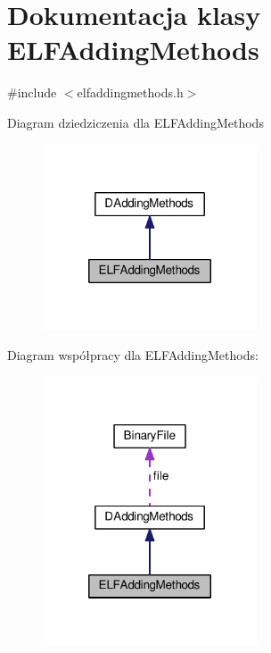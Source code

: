 \hypertarget{class_e_l_f_adding_methods}{\section{Dokumentacja klasy E\-L\-F\-Adding\-Methods}
\label{class_e_l_f_adding_methods}
}


{\ttfamily \#include $<$elfaddingmethods.\-h$>$}



Diagram dziedziczenia dla E\-L\-F\-Adding\-Methods
\nopagebreak
\begin{figure}[H]
\begin{center}
\leavevmode
\includegraphics[width=180pt]{class_e_l_f_adding_methods__inherit__graph}
\end{center}
\end{figure}


Diagram współpracy dla E\-L\-F\-Adding\-Methods\-:
\nopagebreak
\begin{figure}[H]
\begin{center}
\leavevmode
\includegraphics[width=180pt]{class_e_l_f_adding_methods__coll__graph}
\end{center}
\end{figure}
